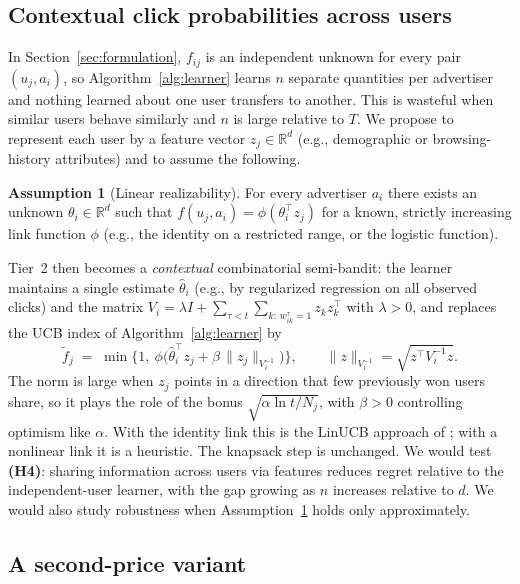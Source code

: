 \documentclass{article}
\theoremstyle{definition}
\newtheorem{assumption}{Assumption}
\theoremstyle{remark}
\newcommand{\R}{\mathbb{R}}
\begin{document}
\subsection{Contextual click probabilities across users}
\label{sec:future-context}

In Section~\ref{sec:formulation}, $f_{ij}$ is an independent unknown for every pair
$(u_j,a_i)$, so Algorithm~\ref{alg:learner} learns $n$ separate quantities per
advertiser and nothing learned about one user transfers to another. This is wasteful
when similar users behave similarly and $n$ is large relative to $T$. We propose to
represent each user by a feature vector $z_j\in\R^d$ (e.g., demographic or
browsing-history attributes) and to assume the following.

\begin{assumption}[Linear realizability]\label{ass:linear}
For every advertiser $a_i$ there exists an unknown $\theta_i\in\R^d$ such that
$f(u_j,a_i)=\phi(\theta_i^\top z_j)$ for a known, strictly increasing link function
$\phi$ (e.g., the identity on a restricted range, or the logistic function).
\end{assumption}

Tier~2 then becomes a \emph{contextual} combinatorial semi-bandit: the learner
maintains a single estimate $\hat\theta_i$ (e.g., by regularized regression on all
observed clicks) and the matrix
$V_i=\lambda I+\sum_{\tau<t}\sum_{k:\,w^\tau_{ik}=1} z_k z_k^\top$ with $\lambda>0$,
and replaces the UCB index of Algorithm~\ref{alg:learner} by
\[
\tilde f_j \;=\; \min\Big\{1,\ \phi\big(\hat\theta_i^\top z_j+\beta\,\|z_j\|_{V_i^{-1}}\big)\Big\},
\qquad \|z\|_{V_i^{-1}}=\sqrt{z^\top V_i^{-1}z}.
\]
The norm is large when $z_j$ points in a direction that few previously won users
share, so it plays the role of the bonus $\sqrt{\alpha\ln t/N_j}$, with $\beta>0$
controlling optimism like $\alpha$. With the identity link this is the LinUCB
approach of \citep{li2010contextual,chu2011contextual}; with a nonlinear link it is a
heuristic. The knapsack step is unchanged. We would test \textbf{(H4)}: sharing
information across users via features reduces regret relative to the independent-user
learner, with the gap growing as $n$ increases relative to $d$. We would also study
robustness when Assumption~\ref{ass:linear} holds only approximately.

\subsection{A second-price variant}
\label{sec:future-secondprice}
\end{document}
